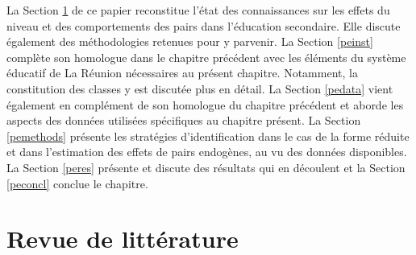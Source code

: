 \documentclass[
]{book}
\begin{document}
\quad La Section \ref{pelitt} de ce papier reconstitue l'état des connaissances sur les effets du niveau et des comportements des pairs dans l'éducation secondaire. Elle discute également des méthodologies retenues pour y parvenir. La Section \ref{peinst} complète son homologue dans le chapitre précédent avec les éléments du système éducatif de La Réunion nécessaires au présent chapitre. Notamment, la constitution des classes y est discutée plus en détail. La Section \ref{pedata} vient également en complément de son homologue du chapitre précédent et aborde les aspects des données utilisées spécifiques au chapitre présent. La Section \ref{pemethods} présente les stratégies d'identification dans le cas de la forme réduite et dans l'estimation des effets de pairs endogènes, au vu des données disponibles. La Section \ref{peres} présente et discute des résultats qui en découlent et la Section \ref{peconcl} conclue le chapitre.

\hypertarget{pelitt}{%
\section{Revue de littérature}\label{pelitt}}
\end{document}
